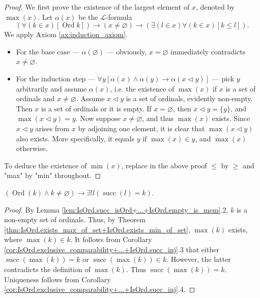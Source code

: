 \begin{proof}
    \leanok
    We first prove the existence of the largest element of $x$, denoted by $\max(x)$. 
    Let $\alpha(x)$ be the $\mathcal{L}$-formula 
    $$(\forall (k \in x)[\operatorname{Ord} k]) \rightarrow (x \neq \varnothing) \rightarrow 
    (\exists(l \in x) \forall (k \in x) [k \leq l]).$$ 
    We apply Axiom \ref{ax:induction_axiom}.
    \begin{itemize}
        \item For the base case — $\alpha (\varnothing)$ — obviously, $x = \varnothing$ immediately 
        contradicts $x \neq \varnothing$.
        \item For the induction step 
        — $\forall y[\alpha(x) \land \alpha(y) \rightarrow \alpha(x \lhd y)]$ — 
        pick $y$ arbitrarily and assume $\alpha(x)$, 
        i.e. the existence of $\max(x)$ if $x$ is a set of ordinals and $x \neq \varnothing$. 
        Assume $x \lhd y$ is a set of ordinals, evidently non-empty. 
        Then $x$ is a set of ordinals or it is empty.
        If $x=\varnothing$, then $x \lhd y = \{y\}$, and $\max(x\lhd y) = y$.
        Now suppose $x \neq \varnothing$, and thus $\max(x)$ exists. 
        Since $x \lhd y$ arises from $x$ by adjoining one element, it is clear that 
        $\max (x \lhd y)$ also exists. 
        More specifically, it equals $y$ if $\max (x) \in y$, and $\max (x)$ otherwise.
    \end{itemize}
    To deduce the existence of $\min (x)$, 
    replace in the above proof $\leq$ by $\geq$ and "max" by "min" throughout.
\end{proof}

\begin{corollary}
    \label{cor:IsOrd.exists_pred}
    \leanok
    $(\operatorname{Ord}(k) \land k \neq \varnothing) \rightarrow 
    \exists!l(\operatorname{succ}(l)=k)$.
\end{corollary}

\begin{proof}
    \leanok
    By Lemma \ref{lem:IsOrd.succ_isOrd+...+IsOrd.empty_is_mem}.2, 
    $k$ is a non-empty set of ordinals. 
    Thus, by Theorem \ref{thm:IsOrd.exists_max_of_set+IsOrd.exists_min_of_set}, 
    $\max (k)$ exists, where $\max (k) \in k$. 
    It follows from Corollary \ref{cor:IsOrd.exclusive_comparability+...+IsOrd.succ_inj}.3 that 
    either $\operatorname{succ}(\max (k)) = k$ or $\operatorname{succ}(\max (k)) \in k$. 
    However, the latter contradicts the definition of $\max (k)$. 
    Thus $\operatorname{succ}(\max (k)) = k$. Uniqueness follows from 
    Corollary \ref{cor:IsOrd.exclusive_comparability+...+IsOrd.succ_inj}.4.
\end{proof}

